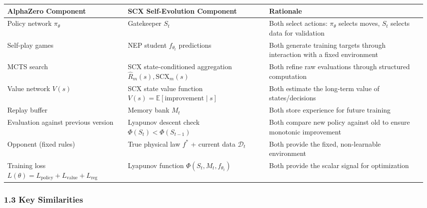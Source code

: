 \documentclass[
  12pt,
]{ctexart}
\begin{document}
\begin{longtable}[]{@{}
  >{\raggedright\arraybackslash}p{}
  >{\raggedright\arraybackslash}p{}
  >{\raggedright\arraybackslash}p{}@{}}
\toprule\noalign{}
\begin{minipage}[b]{\linewidth}\raggedright
AlphaZero Component
\end{minipage} & \begin{minipage}[b]{\linewidth}\raggedright
SCX Self-Evolution Component
\end{minipage} & \begin{minipage}[b]{\linewidth}\raggedright
Rationale
\end{minipage} \\
\midrule\noalign{}
\endhead
\bottomrule\noalign{}
\endlastfoot
Policy network \(\pi_\theta\) & Gatekeeper \(S_t\) & Both select
actions: \(\pi_\theta\) selects moves, \(S_t\) selects data for
validation \\
Self-play games & NEP student \(f_{\theta_t}\) predictions & Both
generate training targets through interaction with a fixed
environment \\
MCTS search & SCX state-conditioned aggregation
\(\hat{R}_m(s), \text{SCX}_m(s)\) & Both refine raw evaluations through
structured computation \\
Value network \(V(s)\) & SCX state value function
\(V(s) = \mathbb{E}[\text{improvement} \mid s]\) & Both estimate the
long-term value of states/decisions \\
Replay buffer & Memory bank \(M_t\) & Both store experience for future
training \\
Evaluation against previous version & Lyapunov descent check
\(\Phi(S_t) < \Phi(S_{t-1})\) & Both compare new policy against old to
ensure monotonic improvement \\
Opponent (fixed rules) & True physical law \(f^*\) + current data
\(\mathcal{D}_t\) & Both provide the fixed, non-learnable environment \\
Training loss
\(L(\theta) = L_{\text{policy}} + L_{\text{value}} + L_{\text{reg}}\) &
Lyapunov function \(\Phi(S_t, M_t, f_{\theta_t})\) & Both provide the
scalar signal for optimization \\
\end{longtable}

\subsubsection{1.3 Key Similarities}\label{key-similarities}
\end{document}
